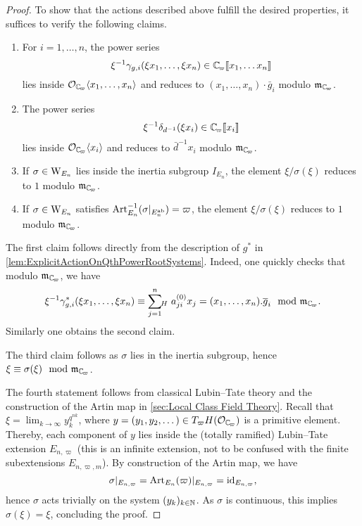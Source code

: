 \documentclass[../main.tex]{subfiles}
\begin{document}
\begin{proof}
To show that the actions described above fulfill the desired properties, it suffices
to verify the following claims.
\begin{enumerate}
  \item For $i = 1, \dots, n$, the power series 
    $$\xi^{-1}\gamma_{g,i}(\xi x_1, \dots, \xi x_n) \in \Cp\llbr x_1, \dots x_n \rrbr$$
    lies inside $\cO_\Cp \langle x_1, \dots, x_n \rangle$ and reduces to $(x_1,
    \dots, x_n)\cdot \bar g_i$ modulo $\fm_\Cp$.
  \item The power series 
    \begin{equation*}
      \xi^{-1} \delta_{d^{-1}} (\xi x_i) \in \Cp \llbr x_i\rrbr 
    \end{equation*}
    lies inside $\cO_\Cp \langle x_i \rangle$ and reduces to $\bar d^{-1} x_i$
    modulo $\fm_\Cp$. 
  \item If $\sigma \in \mathrm W_{E_n}$ lies inside the inertia subgroup $I_{E_n}$,
    the element
    $\xi/\sigma(\xi)$ reduces to $1$ modulo $\fm_\Cp$.
  \item If $\sigma \in \mathrm W_{E_n}$ satisfies $\operatorname{Art}^{-1}_{E_n}(\sigma|_{E_n^{\mathrm{ab}}}) 
    = \varpi$, the element $\xi/\sigma(\xi)$ reduces to $1$ modulo $\fm_\Cp$. 
\end{enumerate}
The first claim follows directly from the description of $g^*$ in
\cref{lem:ExplicitActionOnQthPowerRootSystems}. Indeed, one quickly checks
that modulo $\fm_\Cp$, we have 
$$\xi^{-1} \gamma_{g,i}^*(\xi x_1, \dots, \xi x_n) \equiv \sum_{j=1}^n \sumH
a_{ji}^{(0)} x_j = (x_1, \dots, x_n).\bar g_i \mod \fm_\Cp.$$ 
Similarly one obtains the second claim.

The third claim follows as $\sigma$ lies in the inertia subgroup,
hence $\xi \equiv \sigma(\xi) \mod \fm_\Cp$.

The fourth statement follows from classical Lubin--Tate theory and the construction
of the Artin map in \cref{sec:Local Class Field Theory}. 
Recall that $\xi = \lim_{k \to \infty} y_k^{q^{nk}}$, where $y =(y_1, y_2, \dots) 
\in T_\varpi H(\cO_\Cp)$ is a primitive element.
Thereby, each component of $y$ lies inside the (totally ramified) Lubin--Tate
extension $E_{n,\varpi}$ (this is an infinite extension, not to be confused with
the finite subextensions $E_{n, \varpi,m}$). By construction of the Artin map,
we have
$$\sigma|_{E_{n,\varpi}} = \operatorname{Art}_{E_{n}}(\varpi)|_{E_{n, \varpi}} =  \operatorname{id}_{E_{n,\varpi}},$$
hence $\sigma$ acts trivially on
the system $(y_k)_{k\in \mathbb{N}}$. As $\sigma$ is continuous, this implies
$\sigma(\xi) = \xi$, concluding the proof.
\end{proof}
\end{document}
